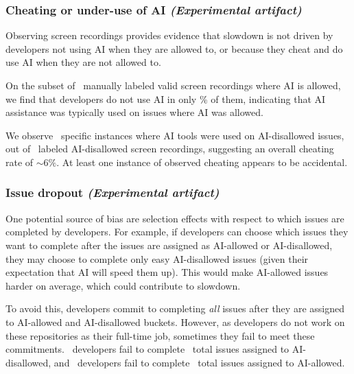 \documentclass{article}
\begin{document}
\subsubsection{Cheating or under-use of AI \textnormal{\textit{(Experimental artifact)}}}
\label{sec:factor-cheating-or-underuse-of-ai}

Observing screen recordings provides evidence that slowdown is not driven by developers not using AI when they are allowed to, or because they cheat and do use AI when they are not allowed to.

On the subset of \NumLoomVideosFilteredAIAllowed\ manually labeled valid screen recordings where AI is allowed, we find that developers do not use AI in only \PctTreatmentNotTakenRate \% of them, indicating that AI assistance was typically used on issues where AI was allowed.

We observe \NumLoomVideosCheating\ specific instances where AI tools were used on AI-disallowed issues, out of \NumLoomVideosInputNoAI\ labeled AI-disallowed screen recordings, suggesting an overall cheating rate of $\sim6\%$. At least one instance of observed cheating appears to be accidental.





\subsubsection{Issue dropout \textnormal{\textit{(Experimental artifact)}}}
\label{sec:factor-issue-dropout}

One potential source of bias are selection effects with respect to which issues are completed by developers. For example, if developers can choose which issues they want to complete after the issues are assigned as AI-allowed or AI-disallowed, they may choose to complete only easy AI-disallowed issues (given their expectation that AI will speed them up). This would make AI-allowed issues harder on average, which could contribute to slowdown.

To avoid this, developers commit to completing \textit{all} issues after they are assigned to AI-allowed and AI-disallowed buckets. However, as developers do not work on these repositories as their full-time job, sometimes they fail to meet these commitments. \NumDevsWithRandomizedIncompleteNoAIIssues\ developers fail to complete \NumNoAIIssuesRandomizedIncompleteIssues\ total issues assigned to AI-disallowed, and \NumDevsWithRandomizedIncompleteAIIssues\ developers fail to complete \NumAIAllowedRandomizedIncompleteIssues\ total issues assigned to AI-allowed.
\end{document}
